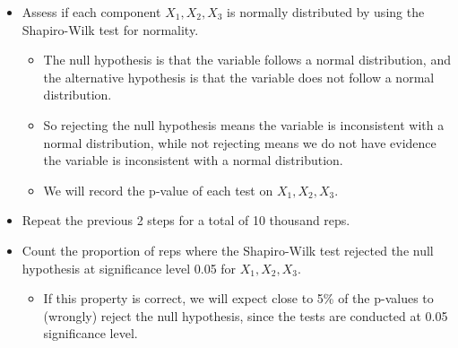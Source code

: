 \documentclass[
]{book}
\providecommand{\tightlist}{%
  \setlength{\itemsep}{0pt}\setlength{\parskip}{0pt}}
\begin{document}
\begin{itemize}
\item
  Assess if each component \(X_1, X_2, X_3\) is normally distributed by using the Shapiro-Wilk test for normality.

  \begin{itemize}
  \tightlist
  \item
    The null hypothesis is that the variable follows a normal distribution, and the alternative hypothesis is that the variable does not follow a normal distribution.
  \item
    So rejecting the null hypothesis means the variable is inconsistent with a normal distribution, while not rejecting means we do not have evidence the variable is inconsistent with a normal distribution.
  \item
    We will record the p-value of each test on \(X_1, X_2, X_3\).
  \end{itemize}
\item
  Repeat the previous 2 steps for a total of 10 thousand reps.
\item
  Count the proportion of reps where the Shapiro-Wilk test rejected the null hypothesis at significance level 0.05 for \(X_1, X_2, X_3\).

  \begin{itemize}
  \tightlist
  \item
    If this property is correct, we will expect close to 5\% of the p-values to (wrongly) reject the null hypothesis, since the tests are conducted at 0.05 significance level.
  \end{itemize}
\end{itemize}
\end{document}
